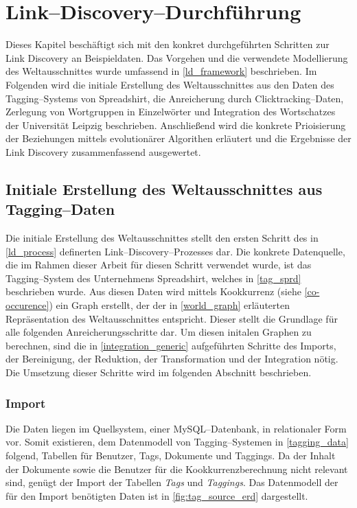 \chapter{Link--Discovery--Durchführung}
\label{link_discovery}

Dieses Kapitel beschäftigt sich mit den konkret durchgeführten Schritten zur Link Discovery an Beispieldaten. Das Vorgehen und die verwendete Modellierung des Weltausschnittes wurde umfassend in \cref{ld_framework} beschrieben. Im Folgenden wird die initiale Erstellung des Weltausschnittes aus den Daten des Tagging--Systems von Spreadshirt, die Anreicherung durch Clicktracking--Daten, Zerlegung von Wortgruppen in Einzelwörter und Integration des Wortschatzes der Universität Leipzig beschrieben. Anschließend wird die konkrete Prioisierung der Beziehungen mittels evolutionärer Algorithen erläutert und die Ergebnisse der Link Discovery zusammenfassend ausgewertet.

\section{Initiale Erstellung des Weltausschnittes aus Tagging--Daten}
\label{ld_tags}

Die initiale Erstellung des Weltausschnittes stellt den ersten Schritt des in \cref{ld_process} definerten Link--Discovery--Prozesses dar. Die konkrete Datenquelle, die im Rahmen dieser Arbeit für diesen Schritt verwendet wurde, ist das Tagging--System des Unternehmens Spreadshirt, welches in \cref{tag_sprd} beschrieben wurde. Aus diesen Daten wird mittels Kookkurrenz (siehe \cref{co-occurence}) ein Graph erstellt, der der in \cref{world_graph} erläuterten Repräsentation des Weltausschnittes entspricht. Dieser stellt die Grundlage für alle folgenden Anreicherungsschritte dar. Um diesen initalen Graphen zu berechnen, sind die in \cref{integration_generic} aufgeführten Schritte des Imports, der Bereinigung, der Reduktion, der Transformation und der Integration nötig. Die Umsetzung dieser Schritte wird im folgenden Abschnitt beschrieben.

\subsection{Import}

Die Daten liegen im Quellsystem, einer MySQL--Datenbank, in relationaler Form vor. Somit existieren, dem Datenmodell von Tagging--Systemen in \cref{tagging_data} folgend, Tabellen für Benutzer, Tags, Dokumente und Taggings. Da der Inhalt der Dokumente sowie die Benutzer für die Kookkurrenzberechnung nicht relevant sind, genügt der Import der Tabellen \emph{Tags} und \emph{Taggings}. Das Datenmodell der für den Import benötigten Daten ist in \cref{fig:tag_source_erd} dargestellt.

